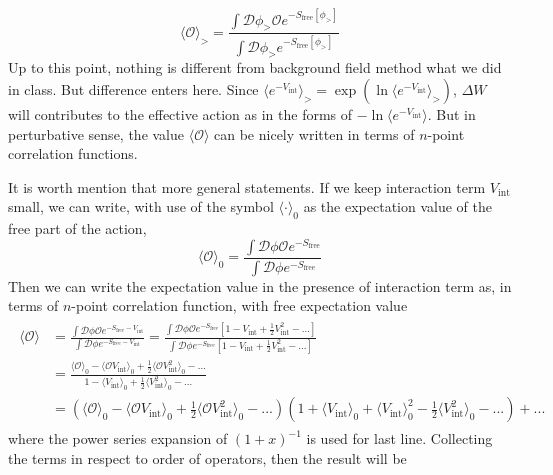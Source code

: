 \documentclass[12pt,halfline,a4paper]{ouparticle}
\begin{document}
\begin{equation}
	\label{eq:largeexpectation}
	\langle\mathcal O \rangle_> = \frac{\int \mathcal D \phi_>\mathcal O e^{-S_\text{free}[\phi_>]}}{\int \mathcal D \phi_> e^{-S_\text{free}[\phi_>]}}
\end{equation}
Up to this point, nothing is different from background field method what we did in class. But difference enters here. Since $\langle e^{-V_\text{int}} \rangle_> =\exp(\ln\langle e^{-V_\text{int}} \rangle_>)$, $\Delta W$ will contributes to the effective action as in the forms of $-\ln\langle e^{-V_\text{int}}\rangle$.
But in perturbative sense, the value $\langle \mathcal O \rangle$ can be nicely written in terms of $n$-point correlation functions. 

It is worth mention that more general statements. If we keep interaction term $V_\text{int}$ small, we can write, with use of the symbol $\langle\cdot\rangle_0$ as the expectation value of the free part of the action,
\begin{equation}
	\langle\mathcal O \rangle_0 = \frac{\int \mathcal D \phi\mathcal O e^{-S_\text{free}}}{\int \mathcal D \phi e^{-S_\text{free}}}
\end{equation}
Then we can write the expectation value in the presence of interaction term as, in terms of $n$-point correlation function, with free expectation value
\begin{align}\begin{split}
	\label{eq:perturbative}
	\langle \mathcal O \rangle &= \frac{\int \mathcal D \phi \mathcal O e^{-S_\text{free}-V_\text{int}}}{\int \mathcal D \phi e^{-S_\text{free}-V_\text{int}}}=\frac{\int \mathcal D \phi \mathcal O e^{-S_\text{free}}[1-V_\text{int}+\frac{1}{2}V_\text{int}^2-...]}{\int \mathcal D \phi e^{-S_\text{free}}[1-V_\text{int}+\frac{1}{2}V_\text{int}^2-...]}\\
	&=\frac{\langle \mathcal O \rangle_0 -\langle \mathcal O V_\text{int} \rangle_0 +\frac{1}{2}\langle \mathcal O V_\text{int}^2 \rangle_0-...}{1 -\langle V_\text{int} \rangle_0 +\frac{1}{2}\langle V_\text{int}^2 \rangle_0-...}\\
	&=(\langle \mathcal O \rangle_0 -\langle \mathcal O V_\text{int} \rangle_0 +\frac{1}{2}\langle \mathcal O V_\text{int}^2 \rangle_0-...)(1+\langle V_\text{int} \rangle_0+\langle V_\text{int} \rangle_0^2 -\frac{1}{2}\langle V_\text{int}^2 \rangle_0-...)+...
\end{split}\end{align}
where the power series expansion of $(1+x)^{-1}$ is used for last line. Collecting the terms in respect to order of operators, then the result will be
\end{document}
